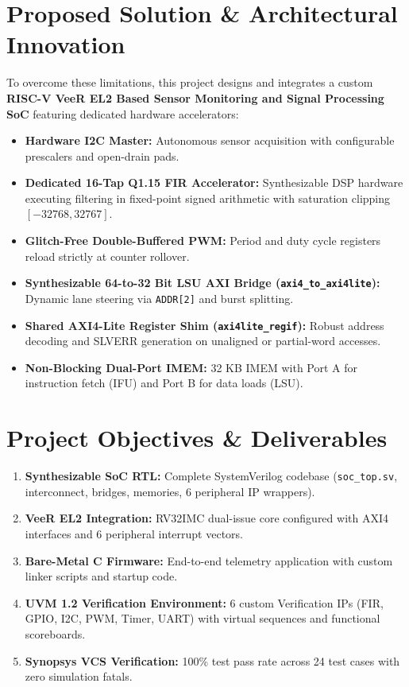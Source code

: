 \documentclass[12pt,a4paper,oneside]{report}
\begin{document}
\section{Proposed Solution \& Architectural Innovation}
To overcome these limitations, this project designs and integrates a custom \textbf{RISC-V VeeR EL2 Based Sensor Monitoring and Signal Processing SoC} featuring dedicated hardware accelerators:
\begin{itemize}
    \item \textbf{Hardware I2C Master:} Autonomous sensor acquisition with configurable prescalers and open-drain pads.
    \item \textbf{Dedicated 16-Tap Q1.15 FIR Accelerator:} Synthesizable DSP hardware executing filtering in fixed-point signed arithmetic with saturation clipping $[-32768, 32767]$.
    \item \textbf{Glitch-Free Double-Buffered PWM:} Period and duty cycle registers reload strictly at counter rollover.
    \item \textbf{Synthesizable 64-to-32 Bit LSU AXI Bridge (\texttt{axi4\_to\_axi4lite}):} Dynamic lane steering via \texttt{ADDR[2]} and burst splitting.
    \item \textbf{Shared AXI4-Lite Register Shim (\texttt{axi4lite\_regif}):} Robust address decoding and SLVERR generation on unaligned or partial-word accesses.
    \item \textbf{Non-Blocking Dual-Port IMEM:} 32 KB IMEM with Port A for instruction fetch (IFU) and Port B for data loads (LSU).
\end{itemize}

\section{Project Objectives \& Deliverables}
\begin{enumerate}
    \item \textbf{Synthesizable SoC RTL:} Complete SystemVerilog codebase (\texttt{soc\_top.sv}, interconnect, bridges, memories, 6 peripheral IP wrappers).
    \item \textbf{VeeR EL2 Integration:} RV32IMC dual-issue core configured with AXI4 interfaces and 6 peripheral interrupt vectors.
    \item \textbf{Bare-Metal C Firmware:} End-to-end telemetry application with custom linker scripts and startup code.
    \item \textbf{UVM 1.2 Verification Environment:} 6 custom Verification IPs (FIR, GPIO, I2C, PWM, Timer, UART) with virtual sequences and functional scoreboards.
    \item \textbf{Synopsys VCS Verification:} 100\% test pass rate across 24 test cases with zero simulation fatals.
\end{enumerate}
\end{document}
